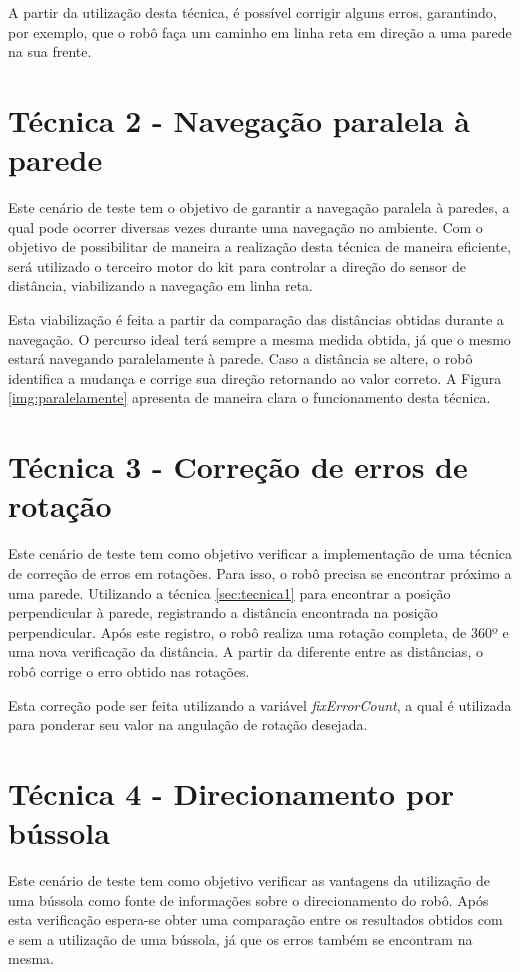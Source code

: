 	A partir da utilização desta técnica, é possível corrigir alguns erros, garantindo, por exemplo, que o robô faça um caminho em linha reta em direção a uma parede na sua frente.

\section{Técnica 2 - Navegação paralela à parede} %
\label{sec:técnica_2_navegação_paralela_à_parede}
	
	Este cenário de teste tem o objetivo de garantir a navegação paralela à paredes, a qual pode ocorrer diversas vezes durante uma navegação no ambiente. Com o objetivo de possibilitar de maneira a realização desta técnica de maneira eficiente, será utilizado o terceiro motor do kit para controlar a direção do sensor de distância, viabilizando a navegação em linha reta.

	Esta viabilização é feita a partir da comparação das distâncias obtidas durante a navegação. O percurso ideal terá sempre a mesma medida obtida, já que o mesmo estará navegando paralelamente à parede. Caso a distância se altere, o robô identifica a mudança e corrige sua direção retornando ao valor correto. A Figura \ref{img:paralelamente} apresenta de maneira clara o funcionamento desta técnica.

\section{Técnica 3 - Correção de erros de rotação} %
\label{sec:técnica_3_correção_de_erros_de_rotação}
	
	Este cenário de teste tem como objetivo verificar a implementação de uma técnica de correção de erros em rotações. Para isso, o robô precisa se encontrar próximo a uma parede. Utilizando a técnica \ref{sec:tecnica1} para encontrar a posição perpendicular à parede, registrando a distância encontrada na posição perpendicular. Após este registro, o robô realiza uma rotação completa, de 360º e uma nova verificação da distância. A partir da diferente entre as distâncias, o robô corrige o erro obtido nas rotações. 

	Esta correção pode ser feita utilizando a variável \textit{fixErrorCount}, a qual é utilizada para ponderar seu valor na angulação de rotação desejada.

\section{Técnica 4 - Direcionamento por bússola} %
\label{sec:técnica_4_direcionamento_por_bússola}
	
	Este cenário de teste tem como objetivo verificar as vantagens da utilização de uma bússola como fonte de informações sobre o direcionamento do robô. Após esta verificação espera-se obter uma comparação entre os resultados obtidos com e sem a utilização de uma bússola, já que os erros também se encontram na mesma.
